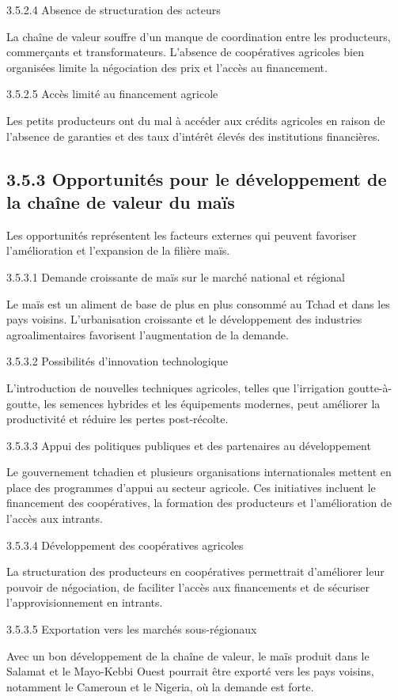 \documentclass[12pt,oneside]{report}
\begin{document}
3.5.2.4 Absence de structuration des acteurs

La chaîne de valeur souffre d’un manque de coordination entre les producteurs, commerçants et transformateurs. L’absence de coopératives agricoles bien organisées limite la négociation des prix et l’accès au financement.

3.5.2.5 Accès limité au financement agricole

Les petits producteurs ont du mal à accéder aux crédits agricoles en raison de l’absence de garanties et des taux d’intérêt élevés des institutions financières.

\subsection{3.5.3 Opportunités pour le développement de la chaîne de valeur du maïs}
Les opportunités représentent les facteurs externes qui peuvent favoriser l’amélioration et l’expansion de la filière maïs.

3.5.3.1 Demande croissante de maïs sur le marché national et régional

Le maïs est un aliment de base de plus en plus consommé au Tchad et dans les pays voisins. L’urbanisation croissante et le développement des industries agroalimentaires favorisent l’augmentation de la demande.

3.5.3.2 Possibilités d’innovation technologique

L’introduction de nouvelles techniques agricoles, telles que l’irrigation goutte-à-goutte, les semences hybrides et les équipements modernes, peut améliorer la productivité et réduire les pertes post-récolte.

3.5.3.3 Appui des politiques publiques et des partenaires au développement

Le gouvernement tchadien et plusieurs organisations internationales mettent en place des programmes d’appui au secteur agricole. Ces initiatives incluent le financement des coopératives, la formation des producteurs et l’amélioration de l’accès aux intrants.

3.5.3.4 Développement des coopératives agricoles

La structuration des producteurs en coopératives permettrait d’améliorer leur pouvoir de négociation, de faciliter l’accès aux financements et de sécuriser l’approvisionnement en intrants.

3.5.3.5 Exportation vers les marchés sous-régionaux

Avec un bon développement de la chaîne de valeur, le maïs produit dans le Salamat et le Mayo-Kebbi Ouest pourrait être exporté vers les pays voisins, notamment le Cameroun et le Nigeria, où la demande est forte.
\end{document}
